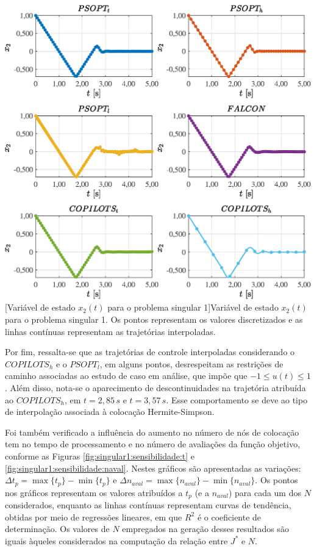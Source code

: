 \noindent
\begin{minipage}{\textwidth}
	\vspace{\onelineskip}
	\centering
	\includegraphics[scale=0.7]{fig/resultados/singular1/traj/x/x_2}
	[Variável de estado $x_2(t)$ para o problema singular 1]{Variável de estado $x_2(t)$ para o problema singular 1. Os pontos representam os valores discretizados e as linhas contínuas representam as trajetórias interpoladas.}
	\label{fig:singular1:x:x2}
	\vspace{\onelineskip}
\end{minipage}

Por fim, ressalta-se que as trajetórias de controle interpoladas considerando o $ COPILOTS_h $ e o $ PSOPT_l $, em alguns pontos, desrespeitam as restrições de caminho associadas ao estudo de caso em análise, que impõe que $ -1 \leq u(t) \leq 1 $. Além disso, nota-se o aparecimento de descontinuidades na trajetória atribuída ao $ COPILOTS_h $, em $ t = 2,85 \, s $ e $ t = 3,57 \, s $. Esse comportamento se deve ao tipo de interpolação associada à colocação Hermite-Simpson.

Foi também verificado a influência do aumento no número de nós de colocação tem no tempo de processamento e no número de avaliações da função objetivo, conforme as Figuras \ref{fig:singular1:sensibilidade:t} e  \ref{fig:singular1:sensibilidade:naval}. Nestes gráficos são apresentadas as variações: $ \Delta t_p = \max\{t_p\} - \min\{t_p\} $ e $ \Delta n_{aval} = \max\{n_{aval}\} - \min\{n_{aval}\} $. Os pontos nos gráficos representam os valores atribuídos a $ t_p $ (e a $ n_{aval} $) para cada um dos $ N $ considerados, enquanto as linhas contínuas representam curvas de tendência, obtidas por meio de regressões lineares, em que $R^2$ é o coeficiente de determinação. Os valores de $ N $ empregados na geração desses resultados são iguais àqueles considerados na computação da relação entre $ J^* $ e $ N $. 


